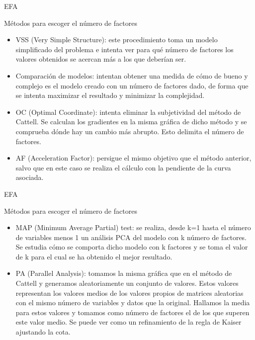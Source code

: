 \documentclass[10pt]{beamer}
\begin{document}
\begin{frame}[fragile]{EFA}
\vspace{10px}
\begin{block}{Métodos para escoger el número de factores}
	\begin{itemize}
		\item VSS (Very Simple Structure): este procedimiento toma un modelo simplificado del problema e intenta ver para qué número de factores los valores obtenidos se acercan más a los que deberían ser.
		\item Comparación de modelos: intentan obtener una medida de cómo de bueno y complejo es el modelo creado con un número de factores dado, de forma que se intenta maximizar el resultado y minimizar la complejidad.
		\item OC (Optimal Coordinate): intenta eliminar la subjetividad del método de Cattell. Se calculan los gradientes en la misma gráfica de dicho método y se comprueba dónde hay un cambio más abrupto. Esto delimita el número de factores.
		\item AF (Acceleration Factor): persigue el mismo objetivo que el método anterior, salvo que en este caso se realiza el cálculo con la pendiente de la curva asociada.
	\end{itemize}
\end{block}
\end{frame}

\begin{frame}[fragile]{EFA}
\vspace{10px}
\begin{block}{Métodos para escoger el número de factores}
	\begin{itemize}
		\item MAP (Minimum Average Partial) test: se realiza, desde k=1 hasta el número de variables menos 1 un análisis PCA del modelo con k número de factores. Se estudia cómo se comporta dicho modelo con k factores y se toma el valor de k para el cual se ha obtenido el mejor resultado.
		\item PA (Parallel Analysis): tomamos la misma gráfica que en el método de Cattell y generamos aleatoriamente un conjunto de valores. Estos valores representan los valores medios de los valores propios de matrices aleatorias con el mismo número de variables y datos que la original. Hallamos la media para estos valores y tomamos como número de factores el de los que superen este valor medio. Se puede ver como un refinamiento de la regla de Kaiser ajustando la cota.
	\end{itemize}
\end{block}
\end{frame}
\end{document}
